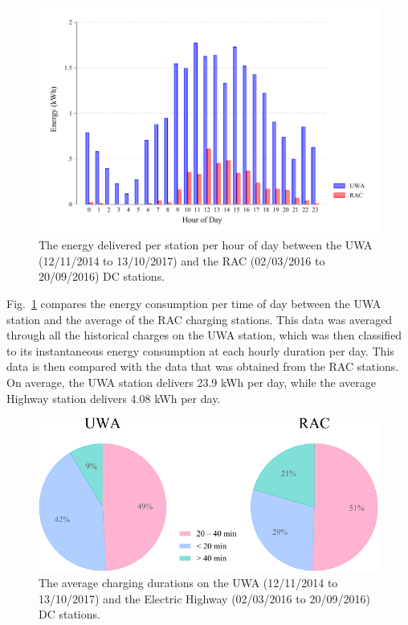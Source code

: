 \begin{figure}[H]
	\centering
	\includegraphics[width=0.8\linewidth]{uwarac_h_e}
	\caption[Energy delivered per station per hour of day]{The energy delivered per station per hour of day between the UWA (12/11/2014 to 13/10/2017) and the RAC (02/03/2016 to 20/09/2016) DC stations.}
	\label{fig:10:uwarac_h_e}
\end{figure}

Fig.~\ref{fig:10:uwarac_h_e} compares the energy consumption per time of day between the UWA station and the average of the RAC charging stations. This data was averaged through all the historical charges on the UWA station, which was then classified to its instantaneous energy consumption at each hourly duration per day. This data is then compared with the data that was obtained from the RAC stations. On average, the UWA station delivers 23.9 kWh per day, while the average Highway station delivers 4.08 kWh per day. 

\begin{figure}[H]
	\centering
	\includegraphics[width=0.8\linewidth]{dur}
	\caption[Average charging durations on the DC stations.]{The average charging durations on the UWA (12/11/2014 to 13/10/2017) and the Electric Highway (02/03/2016 to 20/09/2016) DC stations.}
	\label{fig:10:dur}
\end{figure}


